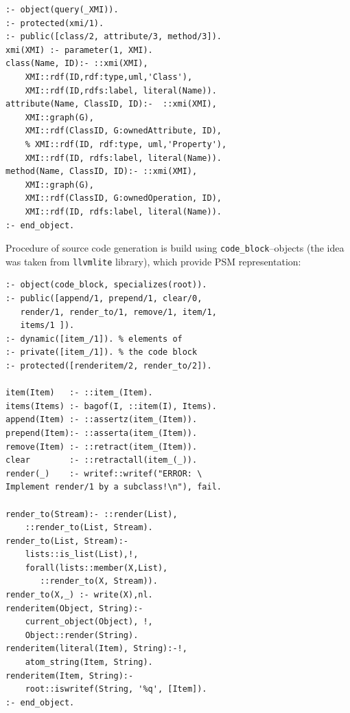 \documentclass[12pt,a4paper]{llncs}
\begin{document}
\begin{multicols}{2}
\begin{verbatim}
:- object(query(_XMI)).
:- protected(xmi/1).
:- public([class/2, attribute/3, method/3]).
xmi(XMI) :- parameter(1, XMI).
class(Name, ID):- ::xmi(XMI),
    XMI::rdf(ID,rdf:type,uml,'Class'),
    XMI::rdf(ID,rdfs:label, literal(Name)).
attribute(Name, ClassID, ID):-  ::xmi(XMI),
    XMI::graph(G),
    XMI::rdf(ClassID, G:ownedAttribute, ID),
    % XMI::rdf(ID, rdf:type, uml,'Property'),
    XMI::rdf(ID, rdfs:label, literal(Name)).
method(Name, ClassID, ID):- ::xmi(XMI),
    XMI::graph(G),
    XMI::rdf(ClassID, G:ownedOperation, ID),
    XMI::rdf(ID, rdfs:label, literal(Name)).
:- end_object.
\end{verbatim}
\end{multicols}

Procedure of source code generation is build using \verb|code_block|--objects (the idea was taken from \verb|llvmlite| library), which provide PSM representation:

\begin{multicols}{2}
\begin{verbatim}
:- object(code_block, specializes(root)).
:- public([append/1, prepend/1, clear/0,
   render/1, render_to/1, remove/1, item/1,
   items/1 ]).
:- dynamic([item_/1]). % elements of
:- private([item_/1]). % the code block
:- protected([renderitem/2, render_to/2]).

item(Item)   :- ::item_(Item).
items(Items) :- bagof(I, ::item(I), Items).
append(Item) :- ::assertz(item_(Item)).
prepend(Item):- ::asserta(item_(Item)).
remove(Item) :- ::retract(item_(Item)).
clear        :- ::retractall(item_(_)).
render(_)    :- writef::writef("ERROR: \
Implement render/1 by a subclass!\n"), fail.

render_to(Stream):- ::render(List),
    ::render_to(List, Stream).
render_to(List, Stream):-
    lists::is_list(List),!,
    forall(lists::member(X,List),
       ::render_to(X, Stream)).
render_to(X,_) :- write(X),nl.
renderitem(Object, String):-
    current_object(Object), !,
    Object::render(String).
renderitem(literal(Item), String):-!,
    atom_string(Item, String).
renderitem(Item, String):-
    root::iswritef(String, '%q', [Item]).
:- end_object.
\end{verbatim}
\end{multicols}
\end{document}
